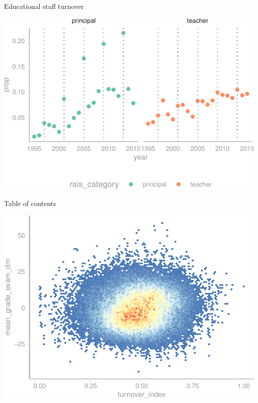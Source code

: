 \documentclass[
  ignorenonframetext,
]{beamer}
\begin{document}
\begin{frame}{Educational staff turnover}
\protect\hypertarget{educational-staff-turnover}{}

\begin{center}\includegraphics{presentation_plas_11-14-19_files/figure-beamer/unnamed-chunk-8-1} \end{center}

\end{frame}

\begin{frame}{Table of contents}
\protect\hypertarget{table-of-contents}{}

\begin{center}\includegraphics{presentation_plas_11-14-19_files/figure-beamer/unnamed-chunk-9-1} \end{center}

\end{frame}
\end{document}
